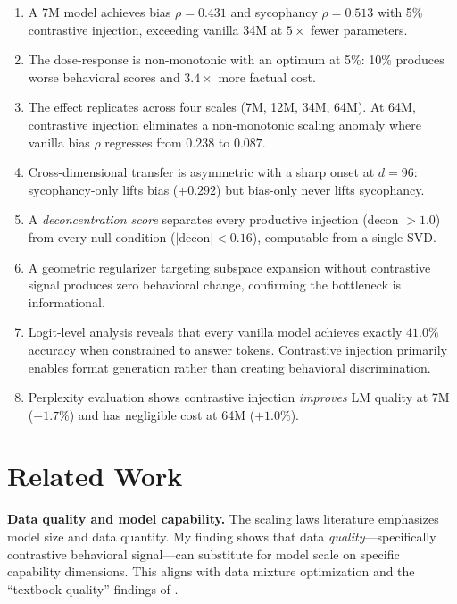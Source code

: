 \documentclass[11pt]{article}
\begin{document}
\begin{enumerate}
  \item A 7M model achieves bias $\rho = 0.431$ and sycophancy $\rho = 0.513$ with 5\% contrastive injection, exceeding vanilla 34M at $5\times$ fewer parameters.

  \item The dose-response is non-monotonic with an optimum at 5\%: 10\% produces worse behavioral scores and $3.4\times$ more factual cost.

  \item The effect replicates across four scales (7M, 12M, 34M, 64M). At 64M, contrastive injection eliminates a non-monotonic scaling anomaly where vanilla bias $\rho$ regresses from $0.238$ to $0.087$.

  \item Cross-dimensional transfer is asymmetric with a sharp onset at $d = 96$: sycophancy-only lifts bias ($+0.292$) but bias-only never lifts sycophancy.

  \item A \emph{deconcentration score} separates every productive injection (decon $> 1.0$) from every null condition ($|\text{decon}| < 0.16$), computable from a single SVD.

  \item A geometric regularizer targeting subspace expansion without contrastive signal produces zero behavioral change, confirming the bottleneck is informational.

  \item Logit-level analysis reveals that every vanilla model achieves exactly $41.0\%$ accuracy when constrained to answer tokens. Contrastive injection primarily enables format generation rather than creating behavioral discrimination.

  \item Perplexity evaluation shows contrastive injection \emph{improves} LM quality at 7M ($-1.7\%$) and has negligible cost at 64M ($+1.0\%$).
\end{enumerate}


\section{Related Work}

\textbf{Data quality and model capability.} The scaling laws literature \citep{kaplan2020scaling,hoffmann2022training} emphasizes model size and data quantity. My finding shows that data \emph{quality}---specifically contrastive behavioral signal---can substitute for model scale on specific capability dimensions. This aligns with data mixture optimization \citep{xie2023doremi} and the ``textbook quality'' findings of \citet{gunasekar2023textbooks}.
\end{document}
